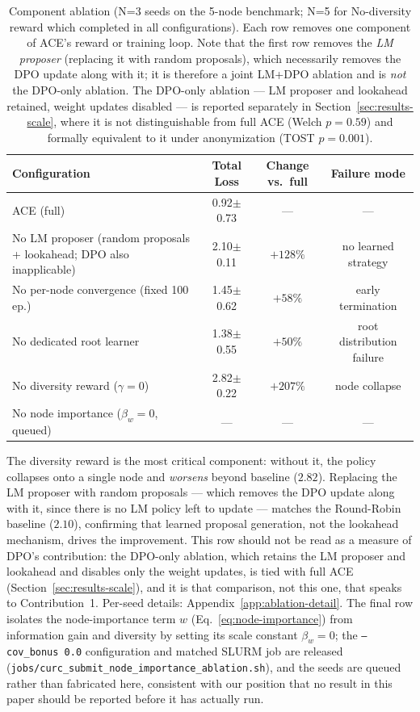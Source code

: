 \documentclass{article}
\theoremstyle{plain}
\theoremstyle{definition}
\theoremstyle{remark}
\begin{document}
\begin{table}[t]
\centering
\caption{Component ablation (N=3 seeds on the 5-node benchmark; N=5 for No-diversity reward which completed in all configurations). Each row removes one component of ACE's reward or training loop. Note that the first row removes the \emph{LM proposer} (replacing it with random proposals), which necessarily removes the DPO update along with it; it is therefore a joint LM+DPO ablation and is \emph{not} the DPO-only ablation. The DPO-only ablation --- LM proposer and lookahead retained, weight updates disabled --- is reported separately in Section~\ref{sec:results-scale}, where it is not distinguishable from full ACE (Welch $p=0.59$) and formally equivalent to it under anonymization (TOST $p=0.001$).}
\label{tab:ablations}
\small
\begin{tabular}{@{}lccc@{}}
\toprule
Configuration & Total Loss & Change vs.\ full & Failure mode \\
\midrule
ACE (full) & 0.92$\pm$0.73 & --- & --- \\
\midrule
No LM proposer (random proposals + lookahead; DPO also inapplicable) & 2.10$\pm$0.11 & $+128\%$ & no learned strategy \\
No per-node convergence (fixed 100 ep.) & 1.45$\pm$0.62 & $+58\%$ & early termination \\
No dedicated root learner & 1.38$\pm$0.55 & $+50\%$ & root distribution failure \\
No diversity reward ($\gamma=0$) & 2.82$\pm$0.22 & $+207\%$ & node collapse \\
No node importance ($\beta_w=0$, queued) & --- & --- & --- \\
\bottomrule
\end{tabular}
\end{table}

The diversity reward is the most critical component: without it, the policy collapses onto a single node and \emph{worsens} beyond baseline ($2.82$). Replacing the LM proposer with random proposals --- which removes the DPO update along with it, since there is no LM policy left to update --- matches the Round-Robin baseline ($2.10$), confirming that learned proposal generation, not the lookahead mechanism, drives the improvement. This row should not be read as a measure of DPO's contribution: the DPO-only ablation, which retains the LM proposer and lookahead and disables only the weight updates, is tied with full ACE (Section~\ref{sec:results-scale}), and it is that comparison, not this one, that speaks to Contribution~1. Per-seed details: Appendix~\ref{app:ablation-detail}. The final row isolates the node-importance term $w$ (Eq.~\ref{eq:node-importance}) from information gain and diversity by setting its scale constant $\beta_w=0$; the \texttt{--cov\_bonus 0.0} configuration and matched SLURM job are released (\texttt{jobs/curc\_submit\_node\_importance\_ablation.sh}), and the seeds are queued rather than fabricated here, consistent with our position that no result in this paper should be reported before it has actually run.
\end{document}
